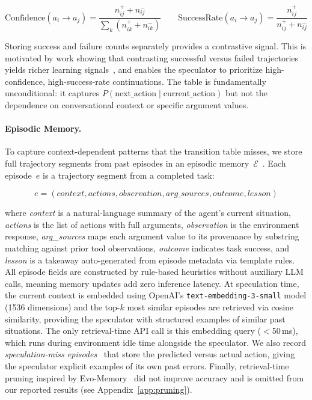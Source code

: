 \documentclass{article}
\begin{document}
\begin{equation}
    \text{Confidence}(a_i \to a_j) = \frac{n^{+}_{ij} + n^{-}_{ij}}{\sum_k (n^{+}_{ik} + n^{-}_{ik})} \qquad
    \text{SuccessRate}(a_i \to a_j) = \frac{n^{+}_{ij}}{n^{+}_{ij} + n^{-}_{ij}}
\end{equation}

Storing success and failure counts separately provides a contrastive signal. This is motivated by work showing that contrasting successful versus failed trajectories yields richer learning signals~\citep{zhao2024expel,ouyang2025reasoningbank}, and enables the speculator to prioritize high-confidence, high-success-rate continuations. The table is fundamentally unconditional: it captures $P(\text{next\_action} \mid \text{current\_action})$ but not the dependence on conversational context or specific argument values.

\paragraph{Episodic Memory.}
To capture context-dependent patterns that the transition table misses, we store full trajectory segments from past episodes in an episodic memory~$\mathcal{E}$~\citep{lewis2020rag,zheng2024synapse,kagaya2024rap,wang2024awm}. Each episode~$e$ is a trajectory segment from a completed task:

\begin{equation}
    e = (\textit{context}, \textit{actions}, \textit{observation},
         \textit{arg\_sources}, \textit{outcome}, \textit{lesson})
\end{equation}

where \emph{context} is a natural-language summary of the agent's current situation, \emph{actions} is the list of actions with full arguments, \emph{observation} is the environment response, \emph{arg\_sources} maps each argument value to its provenance by substring matching against prior tool observations, \emph{outcome} indicates task success, and \emph{lesson} is a takeaway auto-generated from episode metadata via template rules. All episode fields are constructed by rule-based heuristics without auxiliary LLM calls, meaning memory updates add zero inference latency. At speculation time, the current context is embedded using OpenAI's \texttt{text-embedding-3-small} model (1536 dimensions) and the top-$k$ most similar episodes are retrieved via cosine similarity, providing the speculator with structured examples of similar past situations. The only retrieval-time API call is this embedding query ($<$50\,ms), which runs during environment idle time alongside the speculator. We also record \emph{speculation-miss episodes}~\citep{ding2026agenther,ouyang2025reasoningbank} that store the predicted versus actual action, giving the speculator explicit examples of its own past errors. Finally, retrieval-time pruning inspired by Evo-Memory~\citep{wei2025evo} did not improve accuracy and is omitted from our reported results (see Appendix~\ref{app:pruning}).
\end{document}
